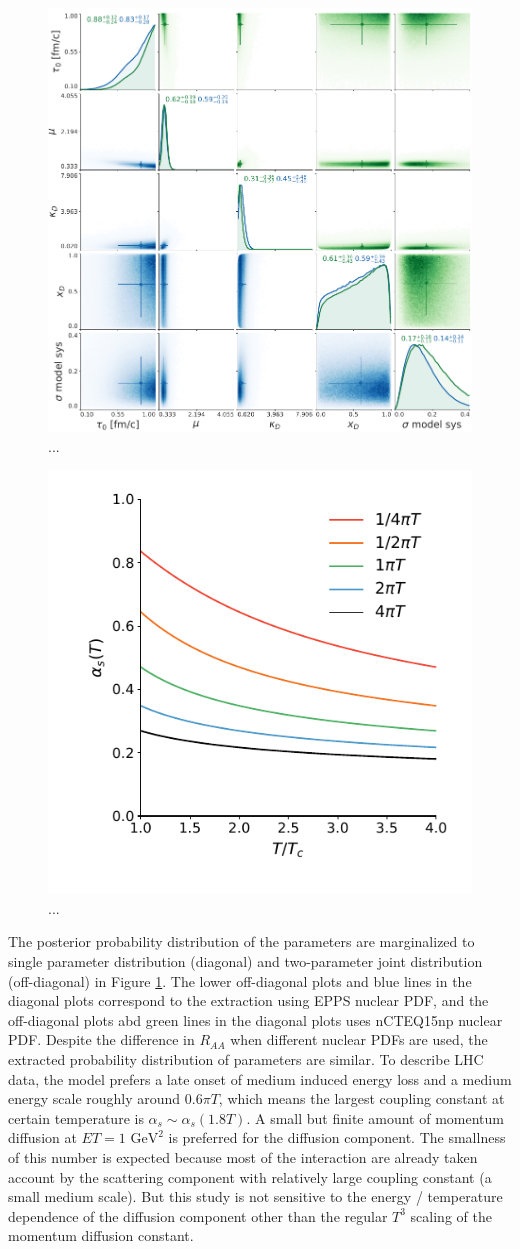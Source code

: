 \documentclass[aps, prc, reprint, amsmath, groupedaddress, nofootinbib]{revtex4-1}
\begin{document}
\begin{figure}
\includegraphics[width=.5\textwidth]{posterior.pdf}
\caption{...}\label{plots:posterior}
\end{figure}
\begin{figure}
\includegraphics[width=.5\textwidth]{alpha_s_at_T.pdf}
\caption{...}\label{plots:alphas}
\end{figure}
The posterior probability distribution of the parameters are marginalized to single parameter distribution (diagonal) and two-parameter joint distribution (off-diagonal) in Figure \ref{plots:posterior}.
The lower off-diagonal plots and blue lines in the diagonal plots correspond to the extraction using EPPS nuclear PDF, and the off-diagonal plots abd green lines in the diagonal plots uses nCTEQ15np nuclear PDF.
Despite the difference in $R_{AA}$ when different nuclear PDFs are used, the extracted probability distribution of parameters are similar.
To describe LHC data, the model prefers a late onset of medium induced energy loss and a medium energy scale roughly around $0.6\pi T$, which means the largest coupling constant at certain temperature is $\alpha_s \sim \alpha_s(1.8T)$.
A small but finite amount of momentum diffusion at $ET=1\textrm{ GeV}^2$ is preferred for the diffusion component.
The smallness of this number is expected because most of the interaction are already taken account by the scattering component with relatively large coupling constant (a small medium scale).
But this study is not sensitive to the energy / temperature dependence of the diffusion component other than the regular $T^3$ scaling of the momentum diffusion constant.   
\end{document}
